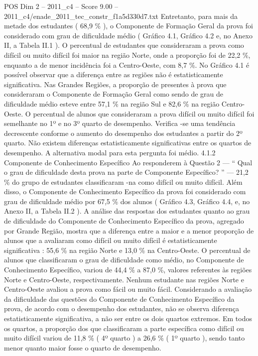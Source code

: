 \begin{textsample}{POS Dim 2 – 2011\_c4 – Score 9.00 – 2011\_c4/enade\_2011\_tec\_constr\_f1a5d330d7.txt}
Entretanto, para mais da metade dos estudantes ( 68,9 \% ), o Componente de Formação Geral da prova foi considerado com grau de dificuldade médio ( Gráfico 4.1, Gráfico 4.2 e, no Anexo II, a Tabela II.1 ).
O percentual de estudantes que consideraram a prova como difícil ou muito difícil foi maior na região Norte, onde a proporção foi de 22,2 \%, enquanto a de menor incidência foi a Centro-Oeste, com 8,7 \%.
No Gráfico 4.1 é possível observar que a diferença entre as regiões não é estatisticamente significativa.
Nas Grandes Regiões, a proporção de presentes à prova que consideraram o Componente de Formação Geral como sendo de grau de dificuldade médio esteve entre 57,1 \% na região Sul e 82,6 \% na região Centro-Oeste.
O percentual de alunos que consideraram a prova difícil ou muito difícil foi semelhante no 1º e no 3º quarto de desempenho.
Verifica -se uma tendência decrescente conforme o aumento do desempenho dos estudantes a partir do 2º quarto.
Não existem diferenças estatisticamente significativas entre os quartos de desempenho.
A alternativa modal para esta pergunta foi médio. 4.1.2 Componente de Conhecimento Específico Ao responderem à Questão 2 — “ Qual o grau de dificuldade desta prova na parte de Componente Específico? ” — 21,2 \% do grupo de estudantes classificaram -na como difícil ou muito difícil.
Além disso, o Componente de Conhecimento Específico da prova foi considerado com grau de dificuldade médio por 67,5 \% dos alunos ( Gráfico 4.3, Gráfico 4.4, e, no Anexo II, a Tabela II.2 ).
A análise das respostas dos estudantes quanto ao grau de dificuldade do Componente de Conhecimento Específico da prova, agregado por Grande Região, mostra que a diferença entre a maior e a menor proporção de alunos que a avaliaram como difícil ou muito difícil é estatisticamente significativa : 55,6 \% na região Norte e 13,0 \% na Centro-Oeste.
O percentual de alunos que classificaram o grau de dificuldade como médio, no Componente de Conhecimento Específico, variou de 44,4 \% a 87,0 \%, valores referentes às regiões Norte e Centro-Oeste, respectivamente.
Nenhum estudante nas regiões Norte e Centro-Oeste avaliou a prova como fácil ou muito fácil.
Considerando a avaliação da dificuldade das questões do Componente de Conhecimento Específico da prova, de acordo com o desempenho dos estudantes, não se observa diferença estatisticamente significativa, a não ser entre os dois quartos extremos.
Em todos os quartos, a proporção dos que classificaram a parte específica como difícil ou muito difícil variou de 11,8 \% ( 4º quarto ) a 26,6 \% ( 1º quarto ), sendo tanto menor quanto maior fosse o quarto de desempenho.

\end{textsample}
